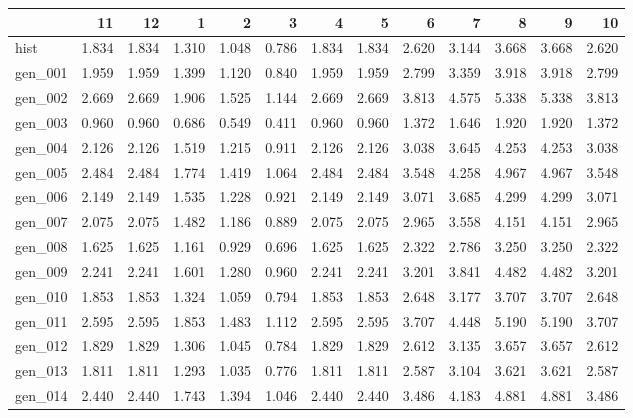 \begin{tabular}{lrrrrrrrrrrrr}
\toprule
{} &     11 &     12 &     1  &     2  &     3  &     4  &     5  &     6  &     7  &     8  &     9  &     10 \\
\midrule
hist    &  1.834 &  1.834 &  1.310 &  1.048 &  0.786 &  1.834 &  1.834 &  2.620 &  3.144 &  3.668 &  3.668 &  2.620 \\
gen\_001 &  1.959 &  1.959 &  1.399 &  1.120 &  0.840 &  1.959 &  1.959 &  2.799 &  3.359 &  3.918 &  3.918 &  2.799 \\
gen\_002 &  2.669 &  2.669 &  1.906 &  1.525 &  1.144 &  2.669 &  2.669 &  3.813 &  4.575 &  5.338 &  5.338 &  3.813 \\
gen\_003 &  0.960 &  0.960 &  0.686 &  0.549 &  0.411 &  0.960 &  0.960 &  1.372 &  1.646 &  1.920 &  1.920 &  1.372 \\
gen\_004 &  2.126 &  2.126 &  1.519 &  1.215 &  0.911 &  2.126 &  2.126 &  3.038 &  3.645 &  4.253 &  4.253 &  3.038 \\
gen\_005 &  2.484 &  2.484 &  1.774 &  1.419 &  1.064 &  2.484 &  2.484 &  3.548 &  4.258 &  4.967 &  4.967 &  3.548 \\
gen\_006 &  2.149 &  2.149 &  1.535 &  1.228 &  0.921 &  2.149 &  2.149 &  3.071 &  3.685 &  4.299 &  4.299 &  3.071 \\
gen\_007 &  2.075 &  2.075 &  1.482 &  1.186 &  0.889 &  2.075 &  2.075 &  2.965 &  3.558 &  4.151 &  4.151 &  2.965 \\
gen\_008 &  1.625 &  1.625 &  1.161 &  0.929 &  0.696 &  1.625 &  1.625 &  2.322 &  2.786 &  3.250 &  3.250 &  2.322 \\
gen\_009 &  2.241 &  2.241 &  1.601 &  1.280 &  0.960 &  2.241 &  2.241 &  3.201 &  3.841 &  4.482 &  4.482 &  3.201 \\
gen\_010 &  1.853 &  1.853 &  1.324 &  1.059 &  0.794 &  1.853 &  1.853 &  2.648 &  3.177 &  3.707 &  3.707 &  2.648 \\
gen\_011 &  2.595 &  2.595 &  1.853 &  1.483 &  1.112 &  2.595 &  2.595 &  3.707 &  4.448 &  5.190 &  5.190 &  3.707 \\
gen\_012 &  1.829 &  1.829 &  1.306 &  1.045 &  0.784 &  1.829 &  1.829 &  2.612 &  3.135 &  3.657 &  3.657 &  2.612 \\
gen\_013 &  1.811 &  1.811 &  1.293 &  1.035 &  0.776 &  1.811 &  1.811 &  2.587 &  3.104 &  3.621 &  3.621 &  2.587 \\
gen\_014 &  2.440 &  2.440 &  1.743 &  1.394 &  1.046 &  2.440 &  2.440 &  3.486 &  4.183 &  4.881 &  4.881 &  3.486 \\

\end{tabular}
